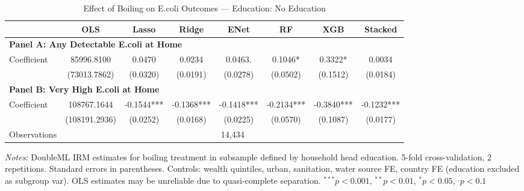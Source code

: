 \begin{table}[htbp]
\centering
\caption{Effect of Boiling on E.coli Outcomes --- Education: No Education}
\label{tab:cate_edu0}
\begin{tabular}{lccccccc}
\toprule
 & OLS & Lasso & Ridge & ENet & RF & XGB & Stacked \\
\midrule
\multicolumn{8}{l}{\textbf{Panel A: Any Detectable E.coli at Home}} \\
\midrule
Coefficient & 85996.8100 & 0.0470 & 0.0234 & 0.0463. & 0.1046* & 0.3322* & 0.0034 \\
 & (73013.7862) & (0.0320) & (0.0191) & (0.0278) & (0.0502) & (0.1512) & (0.0184) \\

\multicolumn{8}{l}{\textbf{Panel B: Very High E.coli at Home}} \\
\midrule
Coefficient & 108767.1644 & -0.1544*** & -0.1368*** & -0.1418*** & -0.2134*** & -0.3840*** & -0.1232*** \\
 & (108191.2936) & (0.0252) & (0.0168) & (0.0225) & (0.0570) & (0.1087) & (0.0177) \\

\midrule
Observations & \multicolumn{7}{c}{14,434} \\
\bottomrule
\end{tabular}
\begin{minipage}{\textwidth}
\footnotesize
\textit{Notes:} DoubleML IRM estimates for boiling treatment in subsample defined by household head education. 
5-fold cross-validation, 2 repetitions. Standard errors in parentheses. 
Controls: wealth quintiles, urban, sanitation, water source FE, country FE (education excluded as subgroup var). 
OLS estimates may be unreliable due to quasi-complete separation. 
$^{***}p<0.001$, $^{**}p<0.01$, $^{*}p<0.05$, $^{.}p<0.1$
\end{minipage}
\end{table}
